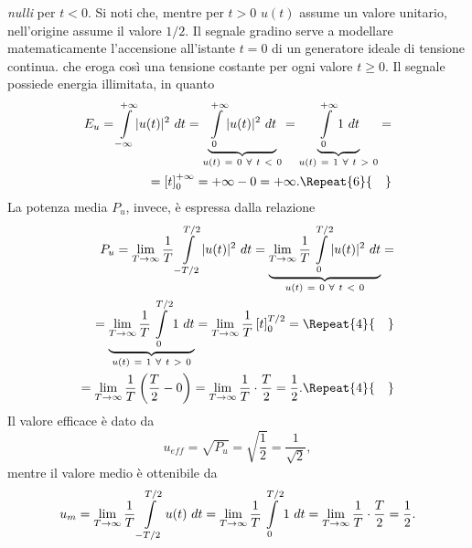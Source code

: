\documentclass[12pt,oneside,openany]{memoir}
\numberwithin{equation}{subsection}
\DeclarePairedDelimiter{\abs}{\lvert}{\rvert}
\newcommand{\quads}[1]{\Repeat{#1}{\quad}}
\newcommand{\dt}{\ dt}
\begin{document}
\textit{nulli} per $t < 0$. Si noti che, mentre per $t > 0$ $u(t)$ assume un
valore unitario, nell'origine assume il valore $1/2$.
\bigbreak
Il segnale gradino serve a modellare matematicamente l'accensione all'istante
$t = 0$ di un generatore ideale di tensione continua. che eroga cos\`i una
tensione costante per ogni valore $t \geq 0$. Il  segnale possiede energia
illimitata, in quanto
\begin{equation}
	\begin{split}
		E_u = \int\displaylimits_{-\infty}^{+\infty} \abs{u(t)}^2 \dt =
		\underbrace{\int\displaylimits_{0}^{+\infty} \abs{u(t)}^2 \dt}_{
			u(t) \ = \ 0 \ \forall \ t \ < \ 0}
		= \underbrace{\int\displaylimits_{0}^{+\infty} 1 \dt}_{u(t) \
		= \ 1 \ \forall \ t \ > \ 0} =
		\\
		= \left[ t \right]_0^{+\infty} = +\infty - 0 = +\infty.
		\quads{6}
	\end{split}
\end{equation}
La potenza media $P_u$, invece, \`e espressa dalla relazione
\begin{equation}
	\begin{split}
		P_u = \lim_{T \rightarrow \infty} \frac{1}{T} 
		\int\displaylimits_{-T/2}^{T/2} \abs{u(t)}^2 \dt = 
		\underbrace{\lim_{T \rightarrow \infty} \frac{1}{T} 
		\int\displaylimits_{0}^{T/2} \abs{u(t)}^2 \dt}_{u(t) \ = \ 0 \ 
		\forall \ t \ < \ 0} =
		\\
		= \underbrace{\lim_{T \rightarrow \infty} \frac{1}{T} 
		\int\displaylimits_{0}^{T/2} 1 \dt}_{u(t) \ = \ 1 \ \forall \ 
		t \ > \ 0} = \lim_{T \rightarrow \infty} \frac{1}{T} \left[ t 
		\right]_0^{T/2} =
		\quads{4}
		\\
		= \lim_{T \rightarrow \infty} \frac{1}{T} \left(\frac{T}{2} - 0
		\right) = \lim_{T \rightarrow \infty} \frac{1}{T} \cdot 
		\frac{T}{2} = \frac{1}{2}.
		\quads{4}
	\end{split}
\end{equation}
Il valore efficace \`e dato da
\begin{equation}
	u_{eff} = \sqrt{P_u} = \sqrt{\frac{1}{2}} = \frac{1}{\sqrt{2}},
\end{equation}
mentre il valore medio \`e ottenibile da
\begin{equation}
	\begin{split}
		u_m = \lim_{T \rightarrow \infty} \frac{1}{T} 
		\int\displaylimits_{-T/2}^{T/2} u(t) \dt = \lim_{T \rightarrow 
		\infty} \frac{1}{T} \int\displaylimits_{0}^{T/2} 1 \dt = 
		\lim_{T \rightarrow \infty} \frac{1}{T} \cdot \frac{T}{2} = 
		\frac{1}{2}.
	\end{split}
\end{equation}
\end{document}
